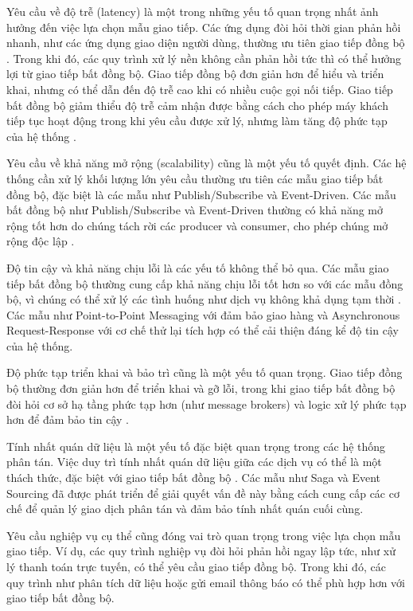 Yêu cầu về độ trễ (latency) là một trong những yếu tố quan trọng nhất ảnh hưởng đến việc lựa chọn mẫu giao tiếp. Các ứng dụng đòi hỏi thời gian phản hồi nhanh, như các ứng dụng giao diện người dùng, thường ưu tiên giao tiếp đồng bộ \cite{richardson2019}. Trong khi đó, các quy trình xử lý nền không cần phản hồi tức thì có thể hưởng lợi từ giao tiếp bất đồng bộ. Giao tiếp đồng bộ đơn giản hơn để hiểu và triển khai, nhưng có thể dẫn đến độ trễ cao khi có nhiều cuộc gọi nối tiếp. Giao tiếp bất đồng bộ giảm thiểu độ trễ cảm nhận được bằng cách cho phép máy khách tiếp tục hoạt động trong khi yêu cầu được xử lý, nhưng làm tăng độ phức tạp của hệ thống \cite{newman2015}.

Yêu cầu về khả năng mở rộng (scalability) cũng là một yếu tố quyết định. Các hệ thống cần xử lý khối lượng lớn yêu cầu thường ưu tiên các mẫu giao tiếp bất đồng bộ, đặc biệt là các mẫu như Publish/Subscribe và Event-Driven. Các mẫu bất đồng bộ như Publish/Subscribe và Event-Driven thường có khả năng mở rộng tốt hơn do chúng tách rời các producer và consumer, cho phép chúng mở rộng độc lập \cite{aksakalli2021}.

Độ tin cậy và khả năng chịu lỗi là các yếu tố không thể bỏ qua. Các mẫu giao tiếp bất đồng bộ thường cung cấp khả năng chịu lỗi tốt hơn so với các mẫu đồng bộ, vì chúng có thể xử lý các tình huống như dịch vụ không khả dụng tạm thời \cite{fowler2014}. Các mẫu như Point-to-Point Messaging với đảm bảo giao hàng và Asynchronous Request-Response với cơ chế thử lại tích hợp có thể cải thiện đáng kể độ tin cậy của hệ thống.

Độ phức tạp triển khai và bảo trì cũng là một yếu tố quan trọng. Giao tiếp đồng bộ thường đơn giản hơn để triển khai và gỡ lỗi, trong khi giao tiếp bất đồng bộ đòi hỏi cơ sở hạ tầng phức tạp hơn (như message brokers) và logic xử lý phức tạp hơn để đảm bảo tin cậy \cite{newman2015}.

Tính nhất quán dữ liệu là một yếu tố đặc biệt quan trọng trong các hệ thống phân tán. Việc duy trì tính nhất quán dữ liệu giữa các dịch vụ có thể là một thách thức, đặc biệt với giao tiếp bất đồng bộ \cite{richardson2019}. Các mẫu như Saga và Event Sourcing đã được phát triển để giải quyết vấn đề này bằng cách cung cấp các cơ chế để quản lý giao dịch phân tán và đảm bảo tính nhất quán cuối cùng.

Yêu cầu nghiệp vụ cụ thể cũng đóng vai trò quan trọng trong việc lựa chọn mẫu giao tiếp. Ví dụ, các quy trình nghiệp vụ đòi hỏi phản hồi ngay lập tức, như xử lý thanh toán trực tuyến, có thể yêu cầu giao tiếp đồng bộ. Trong khi đó, các quy trình như phân tích dữ liệu hoặc gửi email thông báo có thể phù hợp hơn với giao tiếp bất đồng bộ.

